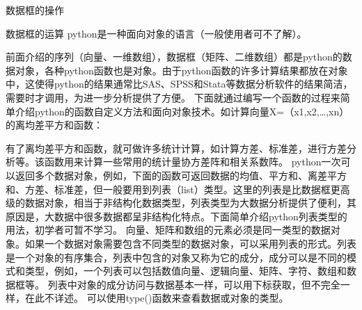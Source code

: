 \documentclass[ignorenonframetext,11pt,xcolor=dvipsnames,aspectratio=1610,hyperref={bookmarksdepth=4}]{beamer}
\begin{document}
\begin{frame}{数据框的操作}
\begin{block}{数据框的运算}
python是一种面向对象的语言（一般使用者可不了解）。

前面介绍的序列（向量、一维数组），数据框（矩阵、二维数组）都是python的数据对象，各种python函数也是对象。由于python函数的许多计算结果都放在对象中，这使得python的结果通常比SAS、SPSS和Stata等数据分析软件的结果简洁，需要时才调用，为进一步分析提供了方便。
下面就通过编写一个函数的过程来简单介绍python的函数自定义方法和面向对象技术。如计算向量X=（x1,x2,\ldots,xn）的离均差平方和函数：

有了离均差平方和函数，就可做许多统计计算，如计算方差、标准差，进行方差分析等。该函数用来计算一些常用的统计量协方差阵和相关系数阵。
python一次可以返回多个数据对象，例如，下面的函数可返回数据的均值、平方和、离差平方和、方差、标准差，但一般要用到列表（list）类型。这里的列表是比数据框更高级的数据对象，相当于非结构化数据类型，列表类型为大数据分析提供了便利，其原因是，大数据中很多数据都呈非结构化特点。下面简单介绍python列表类型的用法，初学者可暂不学习。
向量、矩阵和数组的元素必须是同一类型的数据对象。如果一个数据对象需要包含不同类型的数据对象，可以采用列表的形式。列表是一个对象的有序集合，列表中包含的对象又称为它的成分，成分可以是不同的模式和类型，例如，一个列表可以包括数值向量、逻辑向量、矩阵、字符、数组和数据框等。
列表中对象的成分访问与数据基本一样，可以用下标获取，但不完全一样，在此不详述。
可以使用type()函数来查看数据或对象的类型。

\end{block}

\end{frame}
\end{document}
